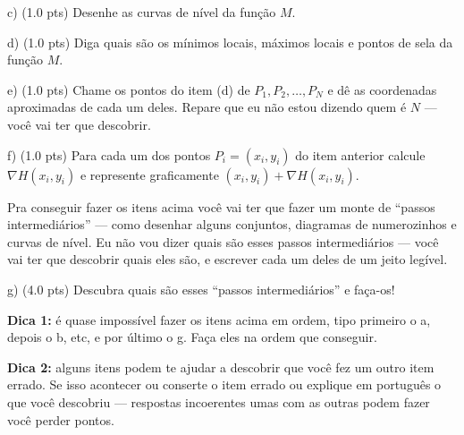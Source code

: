 \documentclass[oneside,12pt]{article}
\begin{document}
{{\msk

c) \B (1.0 pts) Desenhe as curvas de nível da função $M$.

\msk

d) \B (1.0 pts) Diga quais são os mínimos locais, máximos locais e
pontos de sela da função $M$.

\msk

e) \B (1.0 pts) Chame os pontos do item (d) de
$P_1, P_2, \ldots, P_{N}$ e dê as coordenadas aproximadas de cada um
deles. Repare que eu não estou dizendo quem é $N$ --- você vai ter que
descobrir.

\msk

f) \B (1.0 pts) Para cada um dos pontos $P_i=(x_i,y_i)$ do item
anterior calcule $∇H(x_i,y_i)$ e represente graficamente
$(x_i,y_i)+∇H(x_i,y_i)$.

\bsk
\bsk

Pra conseguir fazer os itens acima você vai ter que fazer um monte de
``passos intermediários'' --- como desenhar alguns conjuntos,
diagramas de numerozinhos e curvas de nível. Eu não vou dizer quais
são esses passos intermediários --- você vai ter que descobrir quais
eles são, e escrever cada um deles de um jeito legível.

\bsk
\bsk

g) \B (4.0 pts) Descubra quais são esses ``passos intermediários'' e
faça-os!

\bsk

{\bf Dica 1:} é quase impossível fazer os itens acima em ordem, tipo
primeiro o a, depois o b, etc, e por último o g. Faça eles na ordem
que conseguir.

\ssk

{\bf Dica 2:} alguns itens podem te ajudar a descobrir que você fez um
outro item errado. Se isso acontecer ou conserte o item errado ou
explique em português o que você descobriu --- respostas incoerentes
umas com as outras podem fazer você perder pontos.


}}



\end{document}

